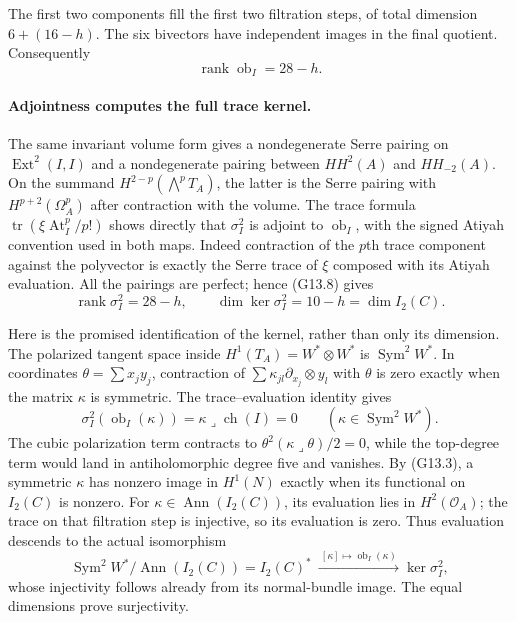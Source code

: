 The first two components fill the first two filtration steps,
of total dimension $6+(16-h)$. The six bivectors have independent
images in the final quotient. Consequently
\[
 \operatorname{rank}\operatorname{ob}_I=28-h.              \tag{G13.8}
\]

\paragraph{Adjointness computes the full trace kernel.}
The same invariant volume form gives a nondegenerate Serre
pairing on $\operatorname{Ext}^2(I,I)$ and a nondegenerate
pairing between $HH^2(A)$ and $HH_{-2}(A)$. On the summand
$H^{2-p}(\bigwedge^pT_A)$, the latter is the Serre pairing
with $H^{p+2}(\Omega_A^p)$ after contraction with the volume.
The trace formula
$\operatorname{tr}(\xi\operatorname{At}_I^p/p!)$ shows directly
that $\sigma_I^2$ is adjoint to $\operatorname{ob}_I$, with the
signed Atiyah convention used in both maps. Indeed contraction
of the $p$th trace component against the polyvector is exactly
the Serre trace of $\xi$ composed with its Atiyah evaluation.
All the pairings are perfect; hence (G13.8) gives
\[
 \operatorname{rank}\sigma_I^2=28-h,
 \qquad\dim\ker\sigma_I^2=10-h=\dim I_2(C).
\]

Here is the promised identification of the kernel, rather than
only its dimension. The polarized tangent space inside
$H^1(T_A)=W^*\otimes W^*$ is $\operatorname{Sym}^2W^*$.
In coordinates $\theta=\sum x_jy_j$, contraction of
$\sum\kappa_{jl}\partial_{x_j}\otimes y_l$ with $\theta$
is zero exactly when the matrix $\kappa$ is symmetric.
The trace--evaluation identity gives
\[
 \sigma_I^2(\operatorname{ob}_I(\kappa))
       =\kappa\mathbin{\lrcorner}\operatorname{ch}(I)=0
       \qquad(\kappa\in\operatorname{Sym}^2W^*).
\]
The cubic polarization term contracts to
$\theta^2(\kappa\lrcorner\theta)/2=0$, while the top-degree
term would land in antiholomorphic degree five and vanishes.
By (G13.3), a symmetric $\kappa$ has nonzero image in $H^1(N)$
exactly when its functional on $I_2(C)$ is nonzero.
For $\kappa\in\operatorname{Ann}(I_2(C))$, its evaluation lies
in $H^2(\mathcal O_A)$; the trace on that filtration step is
injective, so its evaluation is zero. Thus evaluation descends
to the actual isomorphism
\[
 \operatorname{Sym}^2W^*/\operatorname{Ann}(I_2(C))
   =I_2(C)^*
 \ \xrightarrow{\ [\kappa]\mapsto\operatorname{ob}_I(\kappa)\ }
   \ker\sigma_I^2,                                      \tag{G13.9}
\]
whose injectivity follows already from its normal-bundle image.
The equal dimensions prove surjectivity.

